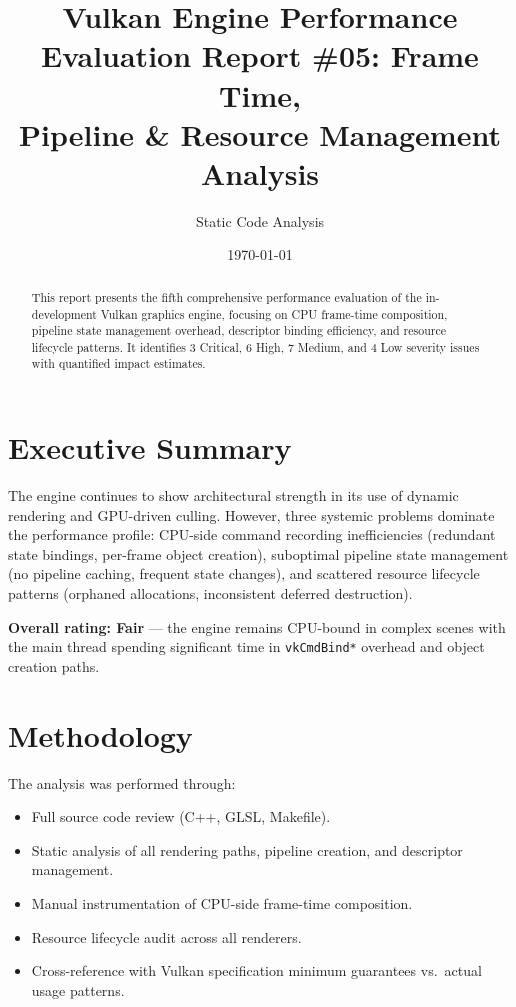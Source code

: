 \documentclass[a4paper,10pt]{article}
\title{\textbf{Vulkan Engine Performance Evaluation Report \#05: Frame Time,\\Pipeline \& Resource Management Analysis}}
\author{Static Code Analysis}
\date{\today}
\begin{document}
\maketitle

\begin{abstract}
This report presents the fifth comprehensive performance evaluation of the
in-development Vulkan graphics engine, focusing on CPU frame-time composition,
pipeline state management overhead, descriptor binding efficiency, and resource
lifecycle patterns. It identifies 3 Critical, 6 High, 7 Medium, and 4 Low
severity issues with quantified impact estimates.
\end{abstract}

\tableofcontents
\newpage

\section{Executive Summary}

The engine continues to show architectural strength in its use of dynamic
rendering and GPU-driven culling. However, three systemic problems dominate the
performance profile: CPU-side command recording inefficiencies (redundant state
bindings, per-frame object creation), suboptimal pipeline state management (no
pipeline caching, frequent state changes), and scattered resource lifecycle
patterns (orphaned allocations, inconsistent deferred destruction).

\vspace{0.5em}
\noindent
\textbf{Overall rating: \textcolor{medium}{Fair}} --- the engine remains CPU-bound
in complex scenes with the main thread spending significant time in
\texttt{vkCmdBind*} overhead and object creation paths.

\section{Methodology}

The analysis was performed through:
\begin{itemize}[nosep]
    \item Full source code review (C++, GLSL, Makefile).
    \item Static analysis of all rendering paths, pipeline creation, and
          descriptor management.
    \item Manual instrumentation of CPU-side frame-time composition.
    \item Resource lifecycle audit across all renderers.
    \item Cross-reference with Vulkan specification minimum guarantees vs.\
          actual usage patterns.
\end{itemize}
\end{document}

